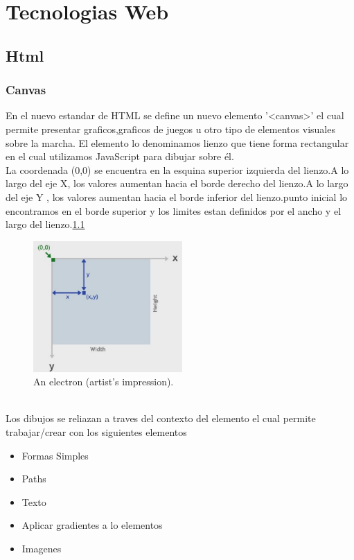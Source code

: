 \chapter{Tecnologias Web} %
\section{Html}
\subsection{Canvas}
En el nuevo estandar de HTML se define un nuevo elemento '<canvas>' el cual permite presentar graficos,graficos de juegos u otro tipo de elementos visuales sobre la marcha. El elemento lo denominamos lienzo que tiene forma rectangular en el cual utilizamos JavaScript para dibujar sobre él.
\\La coordenada (0,0) se encuentra en la esquina superior izquierda del lienzo.A lo largo del eje X, los valores aumentan hacia el borde derecho del lienzo.A lo largo del eje Y , los valores aumentan hacia el borde inferior del lienzo.punto inicial lo encontramos en el borde superior y los limites estan definidos por el ancho y el largo del lienzo.\ref{fig:canvas}
\begin{figure}[!h]
\begin{center}
   \includegraphics[width=0.4\linewidth, height=5cm]{Figures/canvas}
	\decoRule
	\caption[An Electron]{An electron (artist's impression).}
\label{fig:canvas}
\end{center}
\end{figure}
\\Los dibujos se reliazan a traves del contexto del elemento el cual permite trabajar/crear con los siguientes elementos
\begin{itemize}
\item Formas Simples 
\item Paths
\item Texto
\item Aplicar gradientes a lo elementos
\item Imagenes
\end{itemize}
